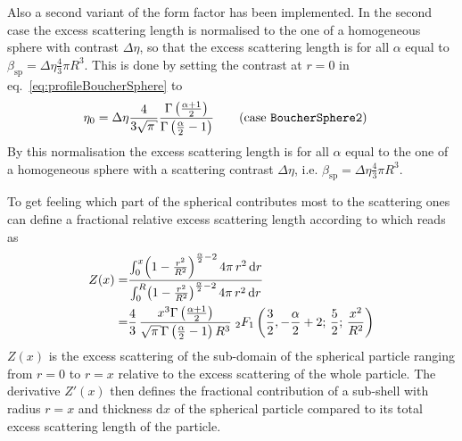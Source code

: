  Also a second variant of the form factor has been implemented. In the second case the excess scattering length is normalised to the one of a homogeneous sphere with contrast $\Delta\eta$, so that the excess scattering length is for all $\alpha$ equal to $\beta_\mathrm{sp}=\Delta\eta \frac{4}{3}\pi R^3$. This is done by setting the contrast at $r=0$ in eq.\ \ref{eq:profileBoucherSphere} to
\begin{align}
\eta_0&=\Delta\eta \frac{4}{3\sqrt{\pi}} \frac{\Gamma\left(\frac{\alpha+1}{2}\right)}{\Gamma\left(\frac{\alpha}{2}-1\right)}  \qquad \mbox{(case \texttt{BoucherSphere2})}
\label{eq:eta0BoucherSphere2}
\end{align}
By this normalisation the excess scattering length is for all $\alpha$ equal to the one of a homogeneous sphere with a scattering contrast $\Delta\eta$, i.e. $\beta_\mathrm{sp}=\Delta\eta \frac{4}{3}\pi R^3$.

To get feeling which part of the spherical contributes most to the scattering ones can define
a fractional relative excess scattering length according to \cite{Boucher1983} which reads as
\begin{align}
Z(x) = & \frac{
            \int_{0}^{x}\! \left( 1-{\frac {{r}^{2}}{{R}^{2}}} \right) ^{\frac{\alpha}{2}-2} 4\pi\,{r}^{2}\,{\rm d}r
           }{
            \int_{0}^{R}\! \left( 1-{\frac {{r}^{2}}{{R}^{2}}} \right) ^{\frac{\alpha}{2}-2} 4\pi\,{r}^{2}\,{\rm d}r
           } \nonumber \\
  = & \frac{4}{3} \,{\frac {{x}^{3}\Gamma  \left(\frac{\alpha+1}{2} \right) }{\sqrt {\pi }
\Gamma  \left( \frac{\alpha}{2}-1 \right) {R}^{3}}
\;_2F_1\left(\frac{3}{2},-\frac{\alpha}{2}+2;\,\frac{5}{2};\,{\frac {{x}^{2}}{{R}^{2}}}\right)}
\end{align}
$Z(x)$ is the excess scattering of the sub-domain of the spherical particle ranging from $r=0$ to $r=x$ relative to the excess scattering of the whole particle. The derivative $Z'(x)$ then defines the fractional contribution of a sub-shell with radius $r=x$ and thickness $\textrm{d}x$  of the spherical particle compared to its total excess scattering length of the particle.

